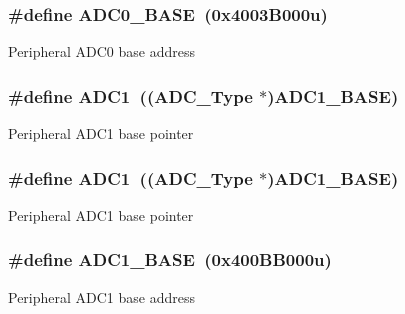 \subsubsection[{\texorpdfstring{A\+D\+C0\+\_\+\+B\+A\+SE}{ADC0_BASE}}]{\setlength{\rightskip}{0pt plus 5cm}\#define A\+D\+C0\+\_\+\+B\+A\+SE~(0x4003\+B000u)}\hypertarget{group__ADC__Peripheral__Access__Layer_ga0aa6c0c068af7a61c770bc6d4322d63e}{}\label{group__ADC__Peripheral__Access__Layer_ga0aa6c0c068af7a61c770bc6d4322d63e}
Peripheral A\+D\+C0 base address 
\subsubsection[{\texorpdfstring{A\+D\+C1}{ADC1}}]{\setlength{\rightskip}{0pt plus 5cm}\#define A\+D\+C1~(({\bf A\+D\+C\+\_\+\+Type} $\ast$){\bf A\+D\+C1\+\_\+\+B\+A\+SE})}\hypertarget{group__ADC__Peripheral__Access__Layer_ga90d2d5c526ce5c0a551f533eccbee71a}{}\label{group__ADC__Peripheral__Access__Layer_ga90d2d5c526ce5c0a551f533eccbee71a}
Peripheral A\+D\+C1 base pointer 
\subsubsection[{\texorpdfstring{A\+D\+C1}{ADC1}}]{\setlength{\rightskip}{0pt plus 5cm}\#define A\+D\+C1~(({\bf A\+D\+C\+\_\+\+Type} $\ast$){\bf A\+D\+C1\+\_\+\+B\+A\+SE})}\hypertarget{group__ADC__Peripheral__Access__Layer_ga90d2d5c526ce5c0a551f533eccbee71a}{}\label{group__ADC__Peripheral__Access__Layer_ga90d2d5c526ce5c0a551f533eccbee71a}
Peripheral A\+D\+C1 base pointer 
\subsubsection[{\texorpdfstring{A\+D\+C1\+\_\+\+B\+A\+SE}{ADC1_BASE}}]{\setlength{\rightskip}{0pt plus 5cm}\#define A\+D\+C1\+\_\+\+B\+A\+SE~(0x400\+B\+B000u)}\hypertarget{group__ADC__Peripheral__Access__Layer_ga695c9a2f892363a1c942405c8d351b91}{}\label{group__ADC__Peripheral__Access__Layer_ga695c9a2f892363a1c942405c8d351b91}
Peripheral A\+D\+C1 base address 
